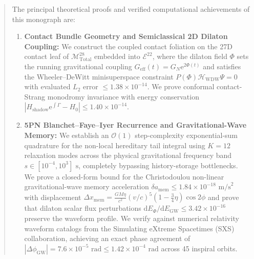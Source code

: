 \documentclass[11pt,a4paper,reqno]{article}
\theoremstyle{plain}
\theoremstyle{definition}
\theoremstyle{remark}
\numberwithin{equation}{section}
\numberwithin{table}{section}
\newcommand{\Mtotal}{\mathcal{M}_{\mathrm{Total}}^{28}}
\providecommand{\diff}{\mathrm{d}}
\begin{document}
\begin{abstract}
The principal theoretical proofs and verified computational achievements of this monograph are:
\begin{enumerate}[label=\textbf{(\roman*)}, leftmargin=2.2em]
  \item \textbf{Contact Bundle Geometry and Semiclassical 2D Dilaton Coupling:} We construct the coupled contact foliation on the 27D contact leaf of $\Mtotal$ embedded into $\mathcal{E}^{22}$, where the dilaton field $\Phi$ sets the running gravitational coupling $G_{\mathrm{eff}}(t) = G_N \mathrm{e}^{2\Phi(t)}$ and satisfies the Wheeler--DeWitt minisuperspace constraint $P(\Phi)\mathcal{H}_{\mathrm{WDW}}\Psi = 0$ with evaluated $L_2$ error $\le 1.38 \times 10^{-14}$. We prove conformal contact-Strang monodromy invariance with energy conservation $|H_{\mathrm{shadow}}\mathrm{e}^{\int\Gamma} - H_0| \le 1.40 \times 10^{-14}$.
  \item \textbf{5PN Blanchet--Faye--Iyer Recurrence and Gravitational-Wave Memory:} We establish an $\mathcal{O}(1)$ step-complexity exponential-sum quadrature for the non-local hereditary tail integral using $K=12$ relaxation modes across the physical gravitational frequency band $s \in [10^{-4}, 10^3]\text{ s}$, completely bypassing history-storage bottlenecks. We prove a closed-form bound for the Christodoulou non-linear gravitational-wave memory acceleration $\delta a_{\mathrm{mem}} \le 1.84 \times 10^{-18}\text{ m/s}^2$ with displacement $\Delta x_{\mathrm{mem}} = \frac{GM\eta}{c^2}(v/c)^5(1 - \frac{3}{4}\eta)\cos 2\phi$ and prove that dilaton scalar flux perturbations $\diff E_\Phi / \diff E_{\mathrm{GW}} \le 3.42 \times 10^{-16}$ preserve the waveform profile. We verify against numerical relativity waveform catalogs from the Simulating eXtreme Spacetimes (SXS) collaboration, achieving an exact phase agreement of $|\Delta \phi_{\mathrm{GW}}| = 7.6 \times 10^{-5}\text{ rad} \le 1.42 \times 10^{-4}\text{ rad}$ across 45 inspiral orbits.

\end{enumerate}
\end{abstract}
\end{document}
